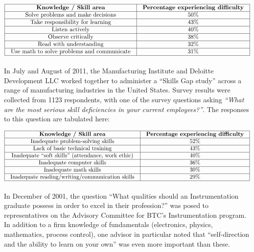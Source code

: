
$$\vbox{\offinterlineskip
\halign{\strut
\vrule \quad\hfil # \ \hfil & 
\vrule \quad\hfil # \ \hfil \vrule \cr
\noalign{\hrule}
%
{\bf Knowledge / Skill area} & {\bf Percentage experiencing difficulty} \cr
%
\noalign{\hrule}
%
Solve problems and make decisions & 50\% \cr
%
\noalign{\hrule}
%
Take responsibility for learning & 43\% \cr
%
\noalign{\hrule}
%
Listen actively & 40\% \cr
%
\noalign{\hrule}
%
Observe critically & 38\% \cr
%
\noalign{\hrule}
%
Read with understanding & 32\% \cr
%
\noalign{\hrule}
%
Use math to solve problems and communicate & 31\% \cr
%
\noalign{\hrule}
} %
}$$ %

\vskip 10pt

\filbreak

In July and August of 2011, the Manufacturing Institute and Deloitte Development LLC worked together to administer a ``Skills Gap study'' across a range of manufacturing industries in the United States.  Survey results were collected from 1123 respondents, with one of the survey questions asking {\it ``What are the most serious skill deficiencies in your current employees?''}.  The responses to this question are tabulated here:


$$\vbox{\offinterlineskip
\halign{\strut
\vrule \quad\hfil # \ \hfil & 
\vrule \quad\hfil # \ \hfil \vrule \cr
\noalign{\hrule}
%
{\bf Knowledge / Skill area} & {\bf Percentage experiencing difficulty} \cr
%
\noalign{\hrule}
%
Inadequate problem-solving skills & 52\% \cr
%
\noalign{\hrule}
%
Lack of basic technical training & 43\% \cr
%
\noalign{\hrule}
%
Inadequate ``soft skills'' (attendance, work ethic) & 40\% \cr
%
\noalign{\hrule}
%
Inadequate computer skills & 36\% \cr
%
\noalign{\hrule}
%
Inadequate math skills & 30\% \cr
%
\noalign{\hrule}
%
Inadequate reading/writing/communication skills & 29\% \cr
%
\noalign{\hrule}
} %
}$$ %

\vskip 10pt


\filbreak

In December of 2001, the question ``What qualities should an Instrumentation graduate possess in order to excel in their profession?'' was posed to representatives on the Advisory Committee for BTC's Instrumentation program.  In addition to a firm knowledge of fundamentals (electronics, physics, mathematics, process control), one advisor in particular noted that ``self-direction and the ability to learn on your own'' was even more important than these.  

